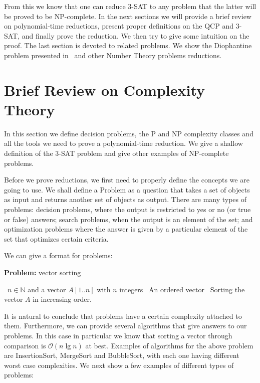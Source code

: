 \documentclass{amsart}
\theoremstyle{plain}
\newcommand{\bigo}{\mathcal{O}}
\begin{document}
From this we know that one can reduce 3-SAT to any problem that the latter will be proved to be
NP-complete. In the next sections we will provide a brief review on polynomial-time reductions,
present proper definitions on the QCP and 3-SAT, and finally prove the reduction. We then try to
give some intuition on the proof. The last section is devoted to related problems. We show the
Diophantine problem presented in~\cite{qcp2} and other Number Theory problems reductions.

\section{Brief Review on Complexity Theory}

In this section we define decision problems, the P and NP complexity classes and all the tools we
need to prove a polynomial-time reduction. We give a shallow definition of the 3-SAT problem and
give other examples of NP-complete problems.

Before we prove reductions, we first need to properly define the concepts we are going to use. We
shall define a Problem as a question that takes a set of objects as input and returns another set
of objects as output. There are many types of problems: decision problems, where the output is
restricted to yes or no (or true or false) answers; search problems, when the output is an element
of the set; and optimization problems where the answer is given by a particular element of the set
that optimizes certain criteria.

We can give a format for problems:

\begin{algorithm}[h]
  \caption*{\textbf{Problem:} vector sorting}
  \begin{algorithmic}[1]
    \Require\, $n\in\mathbb{N}$ and a vector $A[1..n]$ with $n$ integers
    \Ensure\, An ordered vector
    \Description\, Sorting the vector $A$ in increasing order.
  \end{algorithmic}
\end{algorithm}

It is natural to conclude that problems have a certain complexity attached to them. Furthermore, we
can provide several algorithms that give answers to our problems. In this case in particular we
know that sorting a vector through comparison is $\bigo(n\lg n)$ at best. Examples of algorithms
for the above problem are InsertionSort, MergeSort and BubbleSort, with each one having different
worst case complexities.  We next show a few examples of different types of problems:
\newpage
\end{document}
